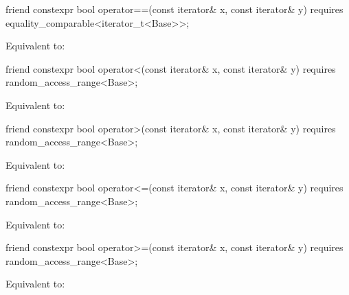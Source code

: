 %
\begin{itemdecl}
friend constexpr bool operator==(const iterator& x, const iterator& y)
  requires equality_comparable<iterator_t<Base>>;
\end{itemdecl}

\begin{itemdescr}
\pnum
\effects
Equivalent to: 
\end{itemdescr}

%
\begin{itemdecl}
friend constexpr bool operator<(const iterator& x, const iterator& y)
  requires random_access_range<Base>;
\end{itemdecl}

\begin{itemdescr}
\pnum
\effects
Equivalent to: 
\end{itemdescr}

%
\begin{itemdecl}
friend constexpr bool operator>(const iterator& x, const iterator& y)
  requires random_access_range<Base>;
\end{itemdecl}

\begin{itemdescr}
\pnum
\effects
Equivalent to: 
\end{itemdescr}

%
\begin{itemdecl}
friend constexpr bool operator<=(const iterator& x, const iterator& y)
  requires random_access_range<Base>;
\end{itemdecl}

\begin{itemdescr}
\pnum
\effects
Equivalent to: 
\end{itemdescr}

%
\begin{itemdecl}
friend constexpr bool operator>=(const iterator& x, const iterator& y)
  requires random_access_range<Base>;
\end{itemdecl}

\begin{itemdescr}
\pnum
\effects
Equivalent to: 
\end{itemdescr}

